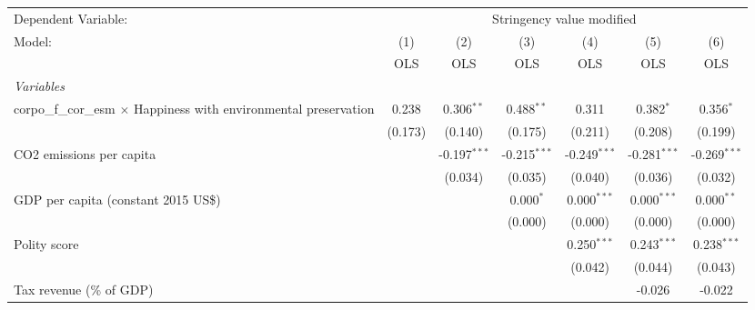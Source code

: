 
\begingroup
\centering
\begin{tabular}{lcccccc}
   \toprule
   Dependent Variable: & \multicolumn{6}{c}{Stringency value modified}\\
   Model:                                                                    & (1)     & (2)            & (3)            & (4)            & (5)            & (6)\\  
                                                                             &  OLS    & OLS            & OLS            & OLS            & OLS            & OLS\\  
   \midrule
   \emph{Variables}\\
   corpo\_f\_cor\_esm $\times$ Happiness with environmental preservation     & 0.238   & 0.306$^{**}$   & 0.488$^{**}$   & 0.311          & 0.382$^{*}$    & 0.356$^{*}$\\   
                                                                             & (0.173) & (0.140)        & (0.175)        & (0.211)        & (0.208)        & (0.199)\\   
   CO2 emissions per capita                                                  &         & -0.197$^{***}$ & -0.215$^{***}$ & -0.249$^{***}$ & -0.281$^{***}$ & -0.269$^{***}$\\   
                                                                             &         & (0.034)        & (0.035)        & (0.040)        & (0.036)        & (0.032)\\   
   GDP per capita (constant 2015 US\$)                                       &         &                & 0.000$^{*}$    & 0.000$^{***}$  & 0.000$^{***}$  & 0.000$^{**}$\\   
                                                                             &         &                & (0.000)        & (0.000)        & (0.000)        & (0.000)\\   
   Polity score                                                              &         &                &                & 0.250$^{***}$  & 0.243$^{***}$  & 0.238$^{***}$\\   
                                                                             &         &                &                & (0.042)        & (0.044)        & (0.043)\\   
   Tax revenue (\% of GDP)                                                   &         &                &                &                & -0.026         & -0.022\\   

\end{tabular}
